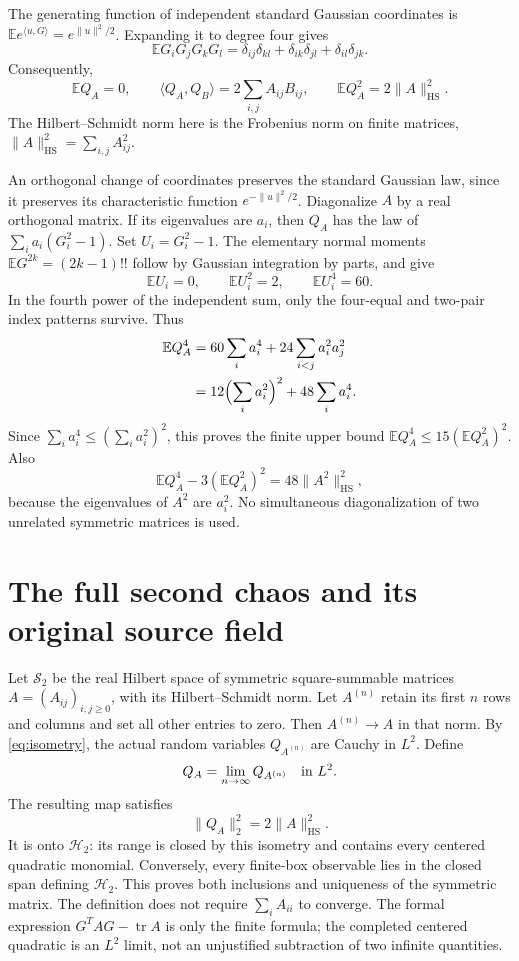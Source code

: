 \documentclass[11pt]{article}
\newcommand{\E}{\mathbb E}
\newcommand{\Hh}{\mathcal H}
\newcommand{\HS}{\mathrm{HS}}
\newcommand{\tr}{\operatorname{tr}}
\begin{document}
The generating function of independent standard Gaussian coordinates
is $\E e^{\langle u,G\rangle}=e^{\|u\|^2/2}$. Expanding it to
degree four gives
\[
 \E G_iG_jG_kG_l
 =\delta_{ij}\delta_{kl}+\delta_{ik}\delta_{jl}
       +\delta_{il}\delta_{jk}.
\]
Consequently,
\begin{equation}\label{eq:isometry}
 \E Q_A=0,\qquad
 \langle Q_A,Q_B\rangle=2\sum_{i,j}A_{ij}B_{ij},\qquad
 \E Q_A^2=2\|A\|_\HS^2.
\end{equation}
The Hilbert--Schmidt norm here is the Frobenius norm on finite
matrices, $\|A\|_\HS^2=\sum_{i,j}A_{ij}^2$.

An orthogonal change of coordinates preserves the standard Gaussian
law, since it preserves its characteristic function
$e^{-\|u\|^2/2}$. Diagonalize $A$ by a real orthogonal matrix. If
its eigenvalues are $a_i$, then $Q_A$ has the law of
$\sum_i a_i(G_i^2-1)$. Set $U_i=G_i^2-1$. The elementary normal
moments $\E G^{2k}=(2k-1)!!$ follow by Gaussian integration by parts,
and give
\[
 \E U_i=0,\qquad \E U_i^2=2,\qquad \E U_i^4=60.
\]
In the fourth power of the independent sum, only the four-equal
and two-pair index patterns survive. Thus
\begin{align}\label{eq:finitefourth}
 \E Q_A^4
 &=60\sum_i a_i^4+24\sum_{i<j}a_i^2a_j^2\\
 &=12\Bigl(\sum_i a_i^2\Bigr)^2+48\sum_i a_i^4.
 \nonumber
\end{align}
Since $\sum_i a_i^4\leq(\sum_i a_i^2)^2$, this proves the finite
upper bound $\E Q_A^4\leq15(\E Q_A^2)^2$. Also
\begin{equation}\label{eq:finitecumulant}
 \E Q_A^4-3(\E Q_A^2)^2
 =48\|A^2\|_\HS^2,
\end{equation}
because the eigenvalues of $A^2$ are $a_i^2$. No simultaneous
diagonalization of two unrelated symmetric matrices is used.

\section{The full second chaos and its original source field}
Let $\mathcal S_2$ be the real Hilbert space of symmetric square-summable
matrices $A=(A_{ij})_{i,j\geq0}$, with its Hilbert--Schmidt norm.
Let $A^{(n)}$ retain its first $n$ rows and columns and set all other
entries to zero. Then $A^{(n)}\to A$ in that norm. By
\eqref{eq:isometry}, the actual random variables $Q_{A^{(n)}}$
are Cauchy in $L^2$. Define
\[
 Q_A=\lim_{n\to\infty}Q_{A^{(n)}}\quad\hbox{in }L^2.
\]
The resulting map satisfies
\begin{equation}\label{eq:fullisometry}
 \|Q_A\|_2^2=2\|A\|_\HS^2.
\end{equation}
It is onto $\Hh_2$: its range is closed by this isometry and
contains every centered quadratic monomial. Conversely, every
finite-box observable lies in the closed span defining $\Hh_2$.
This proves both inclusions and uniqueness of the symmetric matrix.
The definition does not require $\sum_i A_{ii}$ to converge.
The formal expression $G^TAG-\tr A$ is only the finite formula;
the completed centered quadratic is an $L^2$ limit, not an
unjustified subtraction of two infinite quantities.
\end{document}
